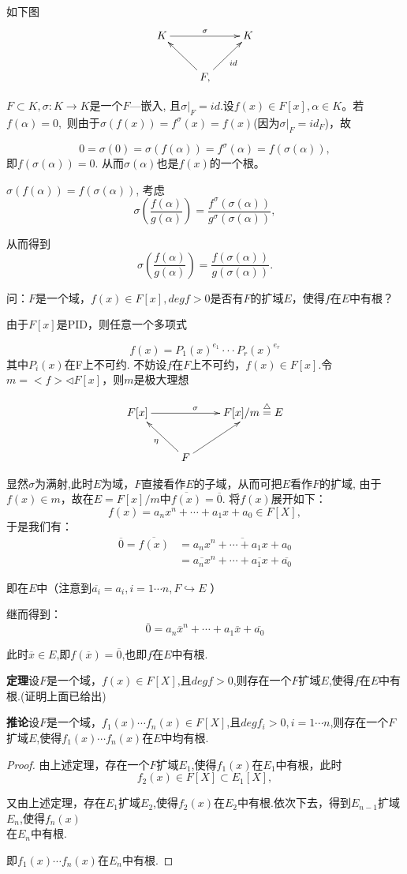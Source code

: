 \documentclass[UTF8]{article}
\begin{document}
如下图
$$
\xymatrix{
	K\ar[rr]^{\sigma }&&K\\& F\ar[lu]\ar[ru]_{id}, & 
}
$$

$F\subset K,\sigma:K\longrightarrow K $是一个$F—$嵌入, 且${\sigma}|_F=id$.设$f(x)\in F[x],\alpha\in K$。若$f(\alpha)=0 ,$
则由于${\sigma}(f(x))=f^{\sigma}(x)=f(x)$(因为${\sigma}|_F=id_F$)，故

$$
0=\sigma(0)={\sigma}(f(\alpha))=f^{\sigma}(\alpha)=f({\sigma}(\alpha)),
$$
即$f({\sigma}(\alpha))=0$.
从而${\sigma}(\alpha)$也是$f(x)$的一个根。

${\sigma}(f(\alpha))=f({\sigma}(\alpha))$, 考虑
$$\sigma(\frac{f({\alpha})}{g({\alpha})})=\frac{f^{\sigma}({\sigma}(\alpha))}{g^{\sigma}({\sigma}(\alpha))},$$

从而得到
$$\sigma(\frac{f({\alpha})}{g({\alpha})})=\frac{f({\sigma}(\alpha))}{g({\sigma}(\alpha))}.$$

问：$F$是一个域，$f(x)\in F[x],degf>0 $是否有$F$的扩域$E$，使得$f$在$E$中有根？

由于$ F[x]$是PID，则任意一个多项式

$$f(x)=P_1(x)^{e_1}\cdot\cdot\cdot P_r(x)^{e_r}$$
其中$P_i(x)$在F上不可约.
不妨设$f$在$F$上不可约，$f(x)\in F[x]$.令$m=<f>\lhd F[x]$，则$m$是极大理想

$$\xymatrix{F[x]\ar[rr]^{\sigma }&&{F[x]/m\stackrel{\bigtriangleup}{=}E}\\& F\ar[lu]^{\eta} \ar[ru] & }$$

显然${\sigma }$为满射,此时$E$为域，$F$直接看作$E$的子域，从而可把$E$看作$F$的扩域,
由于$f(x)\in m$，故在$E=F[x]/m$中$\overline{f(x)}=\overline{0}$.
将$f(x)$展开如下：
$$f(x)=a_nx^n+\cdots+a_1x+a_0\in F[X],$$
于是我们有：
\[
\begin{split}
\overline{0}=\overline{f(x)}&=\overline {a_nx^n+\cdots+a_1x+a_0}\\
&=\overline{a_nx}^n+\cdots+\overline{a_1x}+\overline{a_0}
\end{split}
\]

即在$E$中（注意到$\overline{a_i}=a_i,i=1\cdots n,F\hookrightarrow E$ ）

继而得到：$$\overline{0}=a_n\overline{x}^n+\cdots+a_1\overline{x}+\overline{a_0}$$

此时$\overline{x}\in E$,即$f(\overline{x})=\overline{0}$,也即$f$在$E$中有根.

\textbf{定理}\quad 设$F$是一个域，$f(x)\in F[X]$,且$degf>0$,则存在一个$F$扩域$E$,使得$f$在$E$中有根.(证明上面已给出)

\textbf{推论}\quad 设$F$是一个域，$f_1(x)\cdots f_n(x)\in F[X]$,且$degf_i>0,i=1\cdots n$,则存在一个$F$扩域$E$,使得$f_1(x)\cdots f_n(x)$在$E$中均有根.
\begin{proof}
由上述定理，存在一个$F$扩域$E_1$,使得$f_1(x)$在$E_1$中有根，此时$$f_2(x)\in F[X]\subset E_1[X],$$

又由上述定理，存在$E_1$扩域$E_2$,使得$f_2(x)$在$E_2$中有根.依次下去，得到$E_{n-1}$扩域$E_n$,使得$f_n(x)$\\在$E_n$中有根.

即$f_1(x)\cdots f_n(x)$在$E_n$中有根.
\end{proof}
\end{document}
